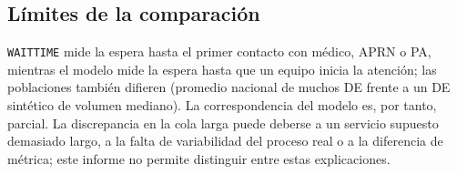 \subsection{Límites de la comparación}
\texttt{WAITTIME} mide la espera hasta el primer contacto con médico, APRN o PA, mientras el
modelo mide la espera hasta que un equipo inicia la atención; las poblaciones también
difieren (promedio nacional de muchos DE frente a un DE sintético de volumen mediano). La
correspondencia del modelo es, por tanto, parcial. La discrepancia en la cola larga puede
deberse a un servicio supuesto demasiado largo, a la falta de variabilidad del proceso real
o a la diferencia de métrica; este informe no permite distinguir entre estas explicaciones.
